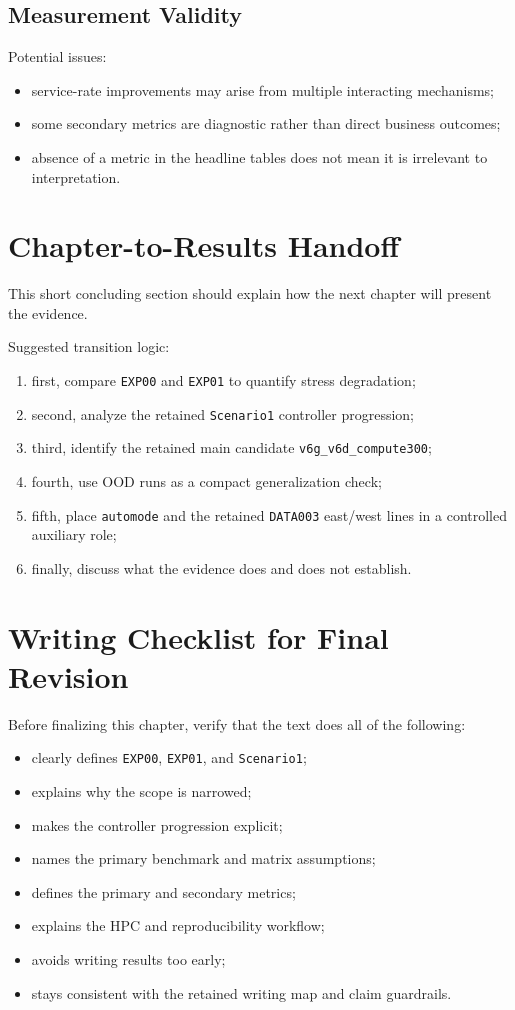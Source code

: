 \subsection{Measurement Validity}

Potential issues:
\begin{itemize}
    \item service-rate improvements may arise from multiple interacting mechanisms;
    \item some secondary metrics are diagnostic rather than direct business outcomes;
    \item absence of a metric in the headline tables does not mean it is irrelevant to interpretation.
\end{itemize}

\section{Chapter-to-Results Handoff}

This short concluding section should explain how the next chapter will present the evidence.

Suggested transition logic:
\begin{enumerate}
    \item first, compare \texttt{EXP00} and \texttt{EXP01} to quantify stress degradation;
    \item second, analyze the retained \texttt{Scenario1} controller progression;
    \item third, identify the retained main candidate \texttt{v6g\_v6d\_compute300};
    \item fourth, use OOD runs as a compact generalization check;
    \item fifth, place \texttt{automode} and the retained \texttt{DATA003} east/west lines in a controlled auxiliary role;
    \item finally, discuss what the evidence does and does not establish.
\end{enumerate}

\section{Writing Checklist for Final Revision}

Before finalizing this chapter, verify that the text does all of the following:
\begin{itemize}
    \item clearly defines \texttt{EXP00}, \texttt{EXP01}, and \texttt{Scenario1};
    \item explains why the scope is narrowed;
    \item makes the controller progression explicit;
    \item names the primary benchmark and matrix assumptions;
    \item defines the primary and secondary metrics;
    \item explains the HPC and reproducibility workflow;
    \item avoids writing results too early;
    \item stays consistent with the retained writing map and claim guardrails.
\end{itemize}

